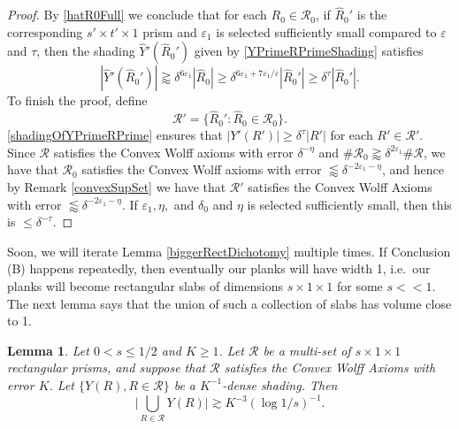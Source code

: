 \documentclass[letterpaper, reqno,11pt]{article}
\numberwithin{equation}{section}
\newcommand{\eps}{\varepsilon}
\numberwithin{thm}{section}
\newtheorem{lem}[thm]{Lemma}
\theoremstyle{remark}
\begin{document}
\begin{proof}
By \eqref{hatR0Full} we conclude that for each $R_0\in\mathcal{R}_0$, if $\hat R_0'$ is the corresponding $s'\times t'\times 1$ prism and $\eps_1$ is selected sufficiently small compared to $\eps$ and $\tau$, then the shading $\hat Y'(\hat R_0')$ given by \eqref{YPrimeRPrimeShading} satisfies 
\begin{equation}\label{shadingOfYPrimeRPrime}
|\hat Y'(\hat R_0')|\gtrapprox \delta^{6\eps_1}|\hat R_0|\geq \delta^{6\eps_1+7\eps_1/\eps}|\hat R_0'|\geq\delta^\tau|\hat R_0'|.
\end{equation}
To finish the proof, define 
\[
\mathcal{R}'=\{\hat R_0'\colon \hat R_0\in\mathcal{R}_0\}.
\]
\eqref{shadingOfYPrimeRPrime} ensures that $|Y'(R')|\geq \delta^{\tau}|R'|$ for each $R'\in\mathcal{R}'.$ Since $\mathcal{R}$ satisfies the Convex Wolff axioms with error $\delta^{-\eta}$ and $\#\mathcal{R}_0\gtrapprox \delta^{2\eps_1}\#\mathcal{R}$, we have that $\mathcal{R}_0$ satisfies the Convex Wolff axioms with error $\lessapprox \delta^{-2\eps_1-\eta}$, and hence by Remark \ref{convexSupSet} we have that $\mathcal{R}'$ satisfies the Convex Wolff Axioms with error $\lessapprox \delta^{-2\eps_1-\eta}$. If $\eps_1,\eta,$ and $\delta_0$ and $\eta$ is selected sufficiently small, then this is $\leq\delta^{-\tau}$. 
\end{proof}




Soon, we will iterate Lemma \ref{biggerRectDichotomy} multiple times. If Conclusion (B) happens repeatedly, then eventually our planks will have width 1, i.e.~our planks will become rectangular slabs of dimensions $s\times 1\times 1$ for some $s<\!\!<1$. The next lemma says that the union of such a collection of slabs has volume close to 1. 


\begin{lem}\label{thickenedPlanesAssouad}
Let $0<s \leq 1/2$ and $K\geq 1$. Let $\mathcal{R}$ be a multi-set of $s \times 1\times 1$ rectangular prisms, and suppose that $\mathcal{R}$ satisfies the Convex Wolff Axioms with error $K$. Let $\{Y(R), R\in\mathcal{R}\}$ be a $K^{-1}$-dense shading. 
%
Then 
\begin{equation}\label{platesLargeVolume}
\Big|  \bigcup_{R\in\mathcal{R}}Y(R)\Big| \gtrsim K^{-3}(\log 1/s)^{-1}.
\end{equation} 
\end{lem}

\end{document}
